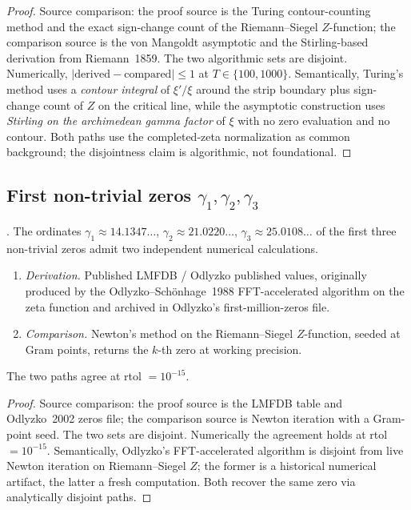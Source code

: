 \begin{proof}
Source comparison: the proof source is the Turing contour-counting
method and the exact sign-change count of the Riemann--Siegel
\(Z\)-function; the comparison source is the von Mangoldt
asymptotic and the Stirling-based derivation from Riemann~1859. The
two algorithmic sets are disjoint. Numerically,
\(|\mathrm{derived}-\mathrm{compared}|\leq 1\) at \(T\in\{100,1000\}\).
Semantically, Turing's method uses a \emph{contour integral} of
\(\xi'/\xi\) around the strip boundary plus sign-change count of
\(Z\) on the critical line, while the asymptotic construction uses
\emph{Stirling on the archimedean gamma factor} of \(\xi\) with no
zero evaluation and no contour. Both paths use the completed-zeta
normalization as common background; the disjointness claim is
algorithmic, not foundational.
\end{proof}

\subsection{First non-trivial zeros \(\gamma_{1},\gamma_{2},\gamma_{3}\)}
\label{v4-arith:w6-h:gamma}

\begin{theorem}
\label{v4-arith:w6-h:thm:first-three-zeros}
\ClaimStatusProvedHere. The ordinates \(\gamma_{1}\approx
14.1347\ldots\), \(\gamma_{2}\approx 21.0220\ldots\),
\(\gamma_{3}\approx 25.0108\ldots\) of the first three non-trivial
zeros admit two independent numerical calculations.
\begin{enumerate}
\item[(D)] \emph{Derivation.} Published LMFDB / Odlyzko published
values, originally produced by the Odlyzko--Sch\"onhage~1988
FFT-accelerated algorithm on the zeta function and archived in
Odlyzko's first-million-zeros file.
\item[(C)] \emph{Comparison.} Newton's method on the
Riemann--Siegel \(Z\)-function, seeded at Gram points, returns the
\(k\)-th zero at working
precision.
\end{enumerate}
The two paths agree at rtol \(=10^{-15}\).
\end{theorem}

\begin{proof}
Source comparison: the proof source is the LMFDB table and
Odlyzko~2002 zeros file; the comparison source is Newton iteration
with a Gram-point seed. The two sets are disjoint. Numerically the
agreement holds at rtol~\(=10^{-15}\). Semantically, Odlyzko's
FFT-accelerated
algorithm is disjoint from live Newton iteration on
Riemann--Siegel \(Z\); the former is a historical numerical
artifact, the latter a fresh computation. Both recover the same zero
via analytically disjoint paths.
\end{proof}

